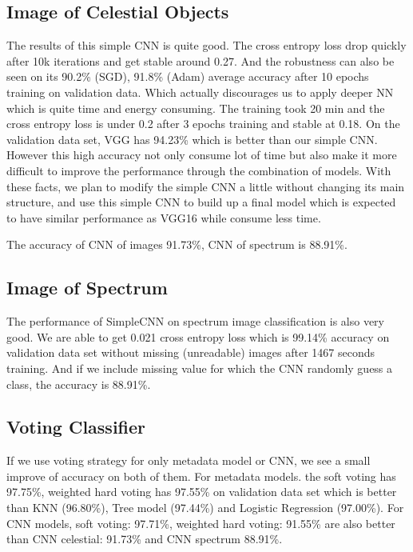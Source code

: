 \documentclass[
  11pt,
]{article}
\begin{document}
\hypertarget{image-of-celestial-objects}{%
\subsection{Image of Celestial Objects}\label{image-of-celestial-objects}}

The results of this simple CNN is quite good. The cross entropy loss drop quickly after 10k iterations and get stable around 0.27. And the robustness can also be seen on its 90.2\% (SGD), 91.8\% (Adam) average accuracy after 10 epochs training on validation data. Which actually discourages us to apply deeper NN which is quite time and energy consuming. The training took 20 min and the cross entropy loss is under 0.2 after 3 epochs training and stable at 0.18. On the validation data set, VGG has 94.23\% which is better than our simple CNN. However this high accuracy not only consume lot of time but also make it more difficult to improve the performance through the combination of models. With these facts, we plan to modify the simple CNN a little without changing its main structure, and use this simple CNN to build up a final model which is expected to have similar performance as VGG16 while consume less time.

The accuracy of CNN of images 91.73\%, CNN of spectrum is 88.91\%.

\hypertarget{image-of-spectrum}{%
\subsection{Image of Spectrum}\label{image-of-spectrum}}

The performance of SimpleCNN on spectrum image classification is also very good. We are able to get 0.021 cross entropy loss which is 99.14\% accuracy on validation data set without missing (unreadable) images after 1467 seconds training. And if we include missing value for which the CNN randomly guess a class, the accuracy is 88.91\%.

\hypertarget{voting-classifier-1}{%
\subsection{Voting Classifier}\label{voting-classifier-1}}

If we use voting strategy for only metadata model or CNN, we see a small improve of accuracy on both of them. For metadata models. the soft voting has 97.75\%, weighted hard voting has 97.55\% on validation data set which is better than KNN (96.80\%), Tree model (97.44\%) and Logistic Regression (97.00\%). For CNN models, soft voting: 97.71\%, weighted hard voting: 91.55\% are also better than CNN celestial: 91.73\% and CNN spectrum 88.91\%.
\end{document}
